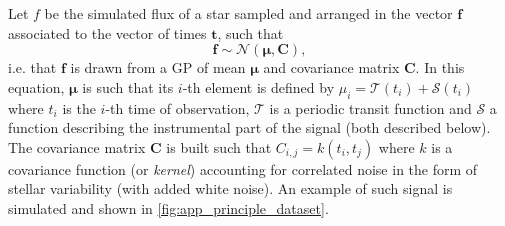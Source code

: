\documentclass[modern]{aastex631}
\begin{document}
\noindent Let $f$ be the simulated flux of a star sampled and arranged in the vector $\bm{f}$ associated to the vector of times $\bm{t}$, such that
\begin{equation*}
    \bm{f} \sim \mathcal{N}(\bm{\mu}, \bm{C}),
\end{equation*}
i.e. that $\bm{f}$ is drawn from a GP of mean $\bm{\mu}$ and covariance matrix $\bm{C}$. In this equation, $\bm{\mu}$ is such that its $i$-th element is defined by  $\mu_i = \mathcal{T}(t_i) + \mathcal{S}(t_i)$ where $t_i$ is the $i$-th time of observation, $\mathcal{T}$ is a periodic transit function and $\mathcal{S}$ a function describing the instrumental part of the signal (both described below). The covariance matrix $\bm{C}$ is built such that $C_{i, j} = k(t_i, t_j)$ where $k$ is a covariance function (or \textit{kernel}) accounting for correlated noise in the form of stellar variability (with added white noise). An example of such signal is simulated and shown in \autoref{fig:app_principle_dataset}.
\end{document}
